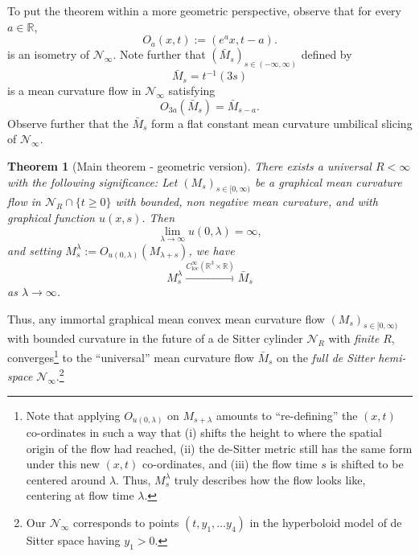 \documentclass[leqno,11pt]{amsart}
\newtheorem{theorem}{Theorem}[section]
\theoremstyle{definition}
\begin{document}
\bigskip

To put the theorem within a more geometric perspective, observe that for every $a\in \mathbb{R}$, 
\begin{equation}\label{O_a_def}
O_{a}(x,t):=(e^a x,t-a).
\end{equation}
is an isometry of $\mathcal{N}_{\infty}$. Note further that $(\bar{M}_s)_{s\in (-\infty,\infty)}$ defined by
\begin{equation}\label{barms_def}
\bar{M}_s=t^{-1}(3s)
\end{equation}
is a mean curvature flow in $\mathcal{N}_{\infty}$  satisfying  
\begin{equation}
O_{3a}\left(\bar{M}_s\right)=\bar{M}_{s-a}.
\end{equation}
{Observe further that the} $\bar{M}_s$ form a flat {constant mean curvature umbilical} slicing of {$\mathcal{N}_{\infty}$}.
 
\begin{theorem}[Main theorem - geometric version]\label{main_thm_geom}
There exists a universal $R<\infty$ with the following significance: Let  $(M_s)_{s\in [0,\infty)}$   be a graphical mean curvature flow in $\mathcal{N}_R\cap \{t\geq 0\}$ with bounded, non negative mean curvature, and  with graphical function $u(x,s)$. Then
\begin{equation}
{ \lim_{\lambda \rightarrow \infty}u(0,\lambda)=\infty,}
\end{equation}
and setting $M^{\lambda}_s:=O_{u(0,\lambda)}\left(M_{\lambda+s}\right)$, we have
\begin{equation}
M^{\lambda}_s \xrightarrow{C^{\infty}_{\mathrm{loc}}(\mathbb{R}^3\times \mathbb{R})} \bar{M}_s
\end{equation}
as $\lambda\rightarrow \infty$.
\end{theorem}
Thus, any immortal graphical mean convex mean curvature flow {$(M_s)_{s\in [0,\infty)}$} with bounded curvature in the future of a de Sitter cylinder $\mathcal{N}_R$ { with \textit{finite} $R$,}  converges\footnote{{Note that applying $O_{u(0,\lambda)}$ on $M_{s+\lambda}$ amounts to ``re-defining'' the $(x,t)$ co-ordinates in such a way that (i) shifts the height to where the spatial origin of the flow had reached, (ii) the de-Sitter metric still has the same form under this new $(x,t)$ co-ordinates,  and (iii) the flow time $s$ is shifted to be centered around $\lambda$. Thus,  $M^{\lambda}_s$ truly describes how the flow looks like, centering at flow time $\lambda$.}} to the ``universal'' mean curvature flow $\bar{M}_s$ on the \textit{full de Sitter {hemi-}space} $\mathcal{N}_{\infty}$.\footnote{Our $\mathcal{N}_\infty$ corresponds to points $(t,y_1,\ldots y_4)$ in the hyperboloid model of de Sitter space having $y_1>0$.} 
\end{document}
